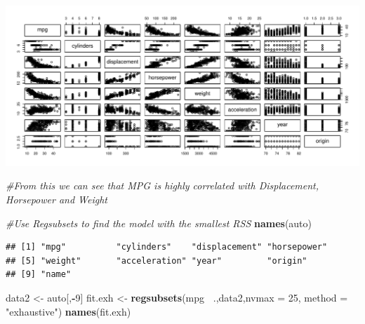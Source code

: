 \documentclass[]{article}
\newenvironment{Shaded}{\begin{snugshade}}{\end{snugshade}}
\newcommand{\KeywordTok}[1]{\textcolor[rgb]{0.13,0.29,0.53}{\textbf{#1}}}
\newcommand{\DataTypeTok}[1]{\textcolor[rgb]{0.13,0.29,0.53}{#1}}
\newcommand{\DecValTok}[1]{\textcolor[rgb]{0.00,0.00,0.81}{#1}}
\newcommand{\StringTok}[1]{\textcolor[rgb]{0.31,0.60,0.02}{#1}}
\newcommand{\CommentTok}[1]{\textcolor[rgb]{0.56,0.35,0.01}{\textit{#1}}}
\newcommand{\OperatorTok}[1]{\textcolor[rgb]{0.81,0.36,0.00}{\textbf{#1}}}
\newcommand{\NormalTok}[1]{#1}
\begin{document}
\begin{Shaded}
\end{Shaded}

\includegraphics{hw2_fall18_files/figure-latex/unnamed-chunk-7-1.pdf}

\begin{Shaded}
\begin{Highlighting}[]
\CommentTok{#From this we can see that MPG is highly correlated with Displacement, Horsepower and Weight}
\end{Highlighting}
\end{Shaded}

\begin{Shaded}
\begin{Highlighting}[]
\CommentTok{#Use Regsubsets to find the model with the smallest RSS }
\KeywordTok{names}\NormalTok{(auto)}
\end{Highlighting}
\end{Shaded}

\begin{verbatim}
## [1] "mpg"          "cylinders"    "displacement" "horsepower"  
## [5] "weight"       "acceleration" "year"         "origin"      
## [9] "name"
\end{verbatim}

\begin{Shaded}
\begin{Highlighting}[]
\NormalTok{data2 <-}\StringTok{ }\NormalTok{auto[,}\OperatorTok{-}\DecValTok{9}\NormalTok{]}
\NormalTok{fit.exh <-}\StringTok{ }\KeywordTok{regsubsets}\NormalTok{(mpg}\OperatorTok{~}\StringTok{ }\NormalTok{.,data2,}\DataTypeTok{nvmax =} \DecValTok{25}\NormalTok{, }\DataTypeTok{method =} \StringTok{"exhaustive"}\NormalTok{)}
\KeywordTok{names}\NormalTok{(fit.exh)}
\end{Highlighting}
\end{Shaded}
\end{document}
